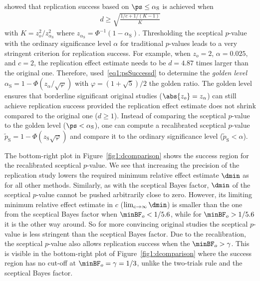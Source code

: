 \citet{Held2021} showed that replication success based on
$\ps \leq \alpha_{\mathrm{S}}$ is achieved when
\begin{align}
  \label{eq1:psSuccessd}
  d \geq \sqrt{\frac{1/c + 1/(K - 1)}{K}}
\end{align}
with $K = z_{o}^{2}/z_{\alpha_{\mathrm{S}}}^{2}$ where
$z_{\alpha_{\mathrm{S}}} = \Phi^{-1}(1 - \alpha_{\mathrm{S}})$. Thresholding the
sceptical $p$-value with the ordinary significance level $\alpha$ for
traditional $p$-values leads to a very stringent criterion for replication
success. For example, when $z_{o} = 2$, $\alpha = 0.025$, and
$c = 2$, the replication effect estimate needs to be
$d = 4.87$ times larger than the original one. Therefore,
\citet{Held2021} used~\eqref{eq1:psSuccessd} to determine the \emph{golden level}
$\alpha_{\mathrm{S}} = 1 - \Phi(z_\alpha/\sqrt{\varphi})$ with
$\varphi = (1 + \sqrt{5})/2$ the golden ratio. The golden level ensures that
borderline significant original studies ($\abs{z_{o}} = z_{\alpha}$) can still
achieve replication success provided the replication effect estimate does not
shrink compared to the original one ($d \geq 1$). Instead of comparing the
sceptical $p$-value to the golden level ($\ps < \alpha_{\mathrm{S}}$), one can
compute a recalibrated sceptical $p$-value
$\tilde{p}_{\mathrm{S}} = 1 - \Phi(z_{\mathrm{S}} \sqrt{\varphi})$ and compare it to
the ordinary significance level ($\tilde{p}_{\mathrm{S}} < \alpha$).

The bottom-right plot in Figure~\ref{fig1:dcomparison} shows the success region
for the recalibrated sceptical $p$-value. We see that increasing the precision
of the replication study lowers the required minimum relative effect estimate
$\dmin$ as for all other methods. Similarly, as with the sceptical Bayes factor,
$\dmin$ of the sceptical $p$-value cannot be pushed arbitrarily close to zero.
However, its limiting minimum relative effect estimate in $c$
($\lim_{c \to \infty}\dmin$) is smaller than the one from the sceptical Bayes
factor when $\minBF_{o} < 1/5.6$, while for
$\minBF_{o} > 1/5.6$ it is the other way around. So for more
convincing original studies the sceptical $p$-value is less stringent than the
sceptical Bayes factor. Due to the recalibration, the sceptical $p$-value also
allows replication success when the $\minBF_{o} > \gamma$. This is visible in
the bottom-right plot of Figure~\ref{fig1:dcomparison} where the success region
has no cut-off at $\minBF_{o} = \gamma = 1/3$, unlike the two-trials rule and
the sceptical Bayes factor.


